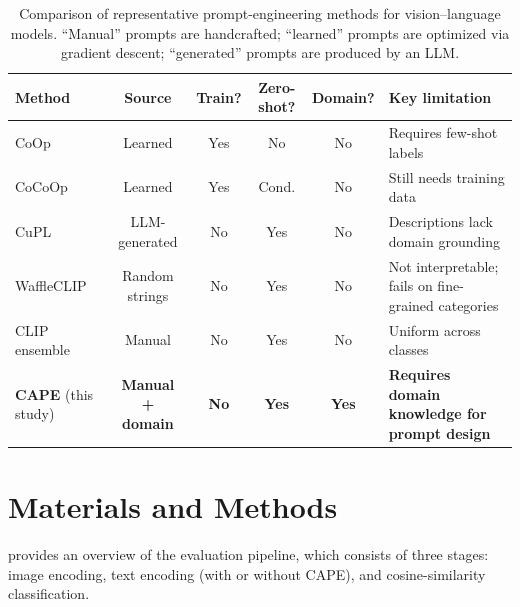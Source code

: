 \documentclass[symmetry,article,submit,pdftex,moreauthors]{Definitions/mdpi}
\begin{document}
\begin{table}[H]
\caption{Comparison of representative prompt-engineering methods for vision--language models. ``Manual'' prompts are handcrafted; ``learned'' prompts are optimized via gradient descent; ``generated'' prompts are produced by an LLM.}
\label{tab:prompt_methods_comparison}
\centering
\small
\setlength{\tabcolsep}{3.5pt}
\begin{tabular}{p{2.2cm} c c c c p{3.2cm}}
\toprule
\textbf{Method} & \textbf{Source} & \textbf{Train?} & \textbf{Zero-shot?} & \textbf{Domain?} & \textbf{Key limitation} \\
\midrule
CoOp~\cite{zhou2022learning} & Learned & Yes & No & No & Requires few-shot labels \\
CoCoOp~\cite{zhou2022conditional} & Learned & Yes & Cond. & No & Still needs training data \\
CuPL~\cite{pratt2023cupl} & LLM-generated & No & Yes & No & Descriptions lack domain grounding \\
WaffleCLIP~\cite{roth2023waffleclip} & Random strings & No & Yes & No & Not interpretable; fails on fine-grained categories \\
CLIP ensemble~\cite{radford2021learning} & Manual & No & Yes & No & Uniform across classes \\
\textbf{CAPE} (this study) & \textbf{Manual + domain} & \textbf{No} & \textbf{Yes} & \textbf{Yes} & \textbf{Requires domain knowledge for prompt design} \\
\bottomrule
\end{tabular}
\end{table}


\section{Materials and Methods}
\label{sec:method}

 provides an overview of the evaluation pipeline, which consists of three stages: image encoding, text encoding (with or without CAPE), and cosine-similarity classification.
\end{document}

